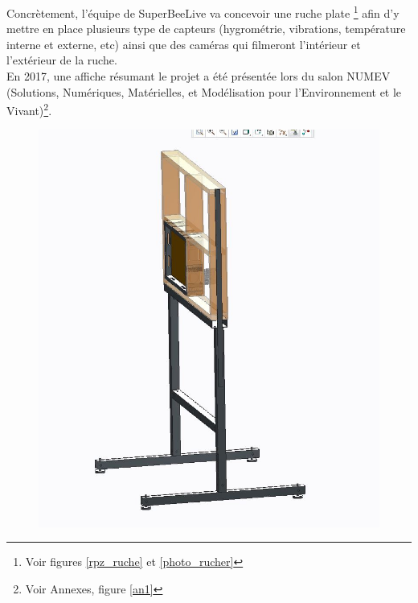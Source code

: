 \documentclass[11pt,french,a4paper]{report}
\begin{document}
Concrètement, l'équipe de SuperBeeLive va concevoir une ruche plate \footnote{Voir figures \ref{rpz_ruche} et \ref{photo_rucher}} afin d'y mettre 
en place plusieurs type  de capteurs (hygrométrie, vibrations, température interne et externe, etc) ainsi que des caméras qui filmeront 
l'intérieur et l'extérieur de la ruche. \\
En 2017, une affiche résumant le projet a été présentée lors du salon NUMEV (Solutions, Numériques, Matérielles, et 
Modélisation pour l'Environnement et le Vivant)\footnote{Voir Annexes, figure \ref{an1} }. \\ 

\begin{figure}[!h]
\centering
\includegraphics[scale=0.3]{../images/schema_ruche/supportrucheplate1.JPG}

\end{figure}
\end{document}
